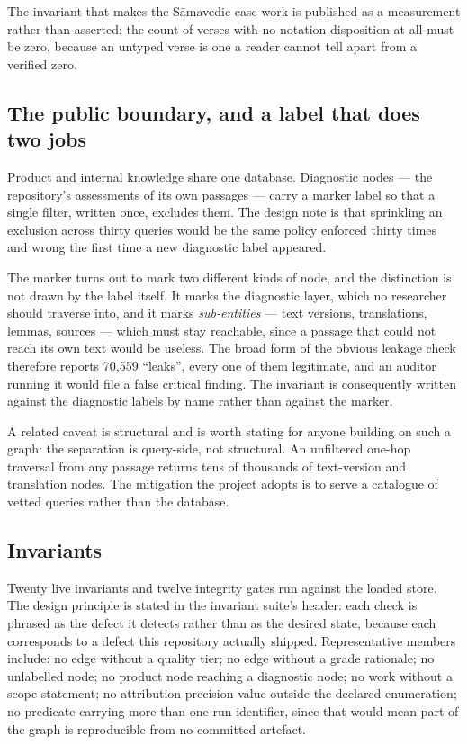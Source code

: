 The invariant that makes the S\=amavedic case work is published as a measurement
rather than asserted: the count of verses with no notation disposition at all must be
zero, because an untyped verse is one a reader cannot tell apart from a verified zero.

\subsection{The public boundary, and a label that does two jobs}

Product and internal knowledge share one database. Diagnostic nodes --- the
repository's assessments of its own passages --- carry a marker label so that a single
filter, written once, excludes them. The design note is that sprinkling an exclusion
across thirty queries would be the same policy enforced thirty times and wrong the
first time a new diagnostic label appeared.

The marker turns out to mark two different kinds of node, and the distinction is not
drawn by the label itself. It marks the diagnostic layer, which no researcher should
traverse into, and it marks \emph{sub-entities} --- text versions, translations,
lemmas, sources --- which must stay reachable, since a passage that could not reach
its own text would be useless. The broad form of the obvious leakage check therefore
reports 70{,}559 ``leaks'', every one of them legitimate, and an auditor running it
would file a false critical finding. The invariant is consequently written against the
diagnostic labels by name rather than against the marker.

A related caveat is structural and is worth stating for anyone building on such a
graph: the separation is query-side, not structural. An unfiltered one-hop traversal
from any passage returns tens of thousands of text-version and translation nodes. The
mitigation the project adopts is to serve a catalogue of vetted queries rather than
the database.

\subsection{Invariants}
\label{sec:invariants}

Twenty live invariants and twelve integrity gates run against the loaded store. The
design principle is stated in the invariant suite's header: each check is phrased as
the defect it detects rather than as the desired state, because each corresponds to a
defect this repository actually shipped. Representative members include: no edge
without a quality tier; no edge without a grade rationale; no unlabelled node; no
product node reaching a diagnostic node; no work without a scope statement; no
attribution-precision value outside the declared enumeration; no predicate carrying
more than one run identifier, since that would mean part of the graph is reproducible
from no committed artefact.

